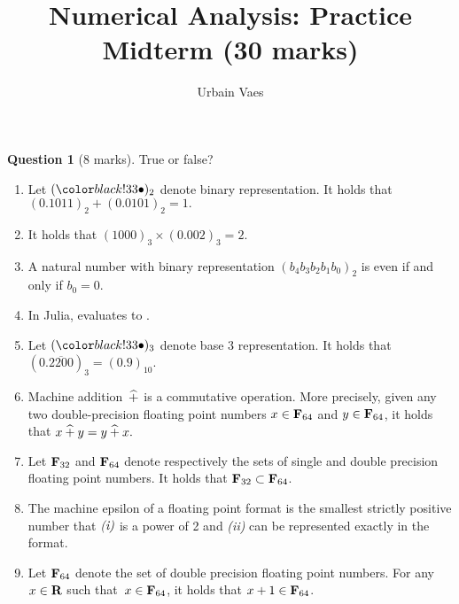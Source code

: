 \documentclass[11pt]{article}
\theoremstyle{definition}
\newtheorem{question}{Question}
\begin{document}
\title{Numerical Analysis: Practice Midterm (30 marks)}
\author{Urbain Vaes}
\maketitle

\begin{question}
    [8 marks]
    True or false?
    \begin{enumerate}

        \item
            Let $(\placeholder)_2$ denote binary representation.
            It holds that
            \(
                (0.1011)_2 + (0.0101)_2 = 1.
            \)
        \item It holds that
            \(
                (1000)_3 \times (0.002)_3 = 2.
            \)

        \item
            A natural number with binary representation $(b_4 b_3 b_2 b_1 b_0)_2$ is even if and only if $b_0 = 0$.

        \item
            In Julia,  evaluates to .

        \item
            Let $(\placeholder)_3$ denote base 3 representation.
            It holds that $(0.\overline{2200})_3 = (0.9)_{10}$.

        \item
            Machine addition~$\mathbin{\widehat +}$ is a commutative operation.
            More precisely, given any two double-precision floating point numbers $x \in \mathbf F_{64}$ and $y \in \mathbf F_{64}$,
            it holds that
            \(
                x \mathbin{\widehat +} y = y \mathbin{\widehat +} x.
            \)

        \item
            Let $\mathbf F_{32}$ and $\mathbf F_{64}$ denote respectively the sets of single and double precision floating point numbers.
            It holds that $\mathbf F_{32} \subset \mathbf F_{64}$.

        \item
            The machine epsilon of a floating point format is the smallest strictly positive number that $\emph{(i)}$ is a power of 2 and \emph{(ii)} can be represented exactly in the format.

        \item
            Let $\mathbf F_{64}$ denote the set of double precision floating point numbers.
            For any $x \in \mathbf R$ such that~$x \in \mathbf F_{64}$,
            it holds that $x + 1 \in \mathbf F_{64}$.


\end{enumerate}
\end{question}
\end{document}
